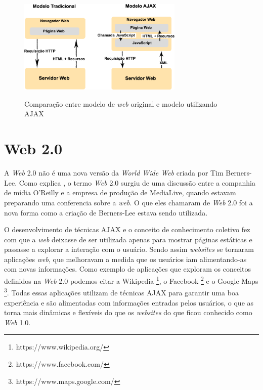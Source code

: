 \begin{figure}[!htb]
    \centering
    \caption{Comparação entre modelo de \textit{web} original e modelo utilizando AJAX}
    \includegraphics[width=0.7\textwidth]{./04-figuras/fund-teorica/comparacao_ajax}
    \label{fig:compajax}
\end{figure}


\section{Web 2.0}
\label{sec:web20}
A \textit{Web} 2.0 não é uma nova versão da \textit{World Wide Web} criada por Tim Berners-Lee. Como explica \cite{Web20}, o termo \textit{Web} 2.0 surgiu de uma discussão entre a companhia de mídia O'Reilly e a empresa de produção de MediaLive, quando estavam preparando uma conferencia sobre a \textit{web}. O que eles chamaram de \textit{Web} 2.0 foi a nova forma como a criação de Berners-Lee estava sendo utilizada.

O desenvolvimento de técnicas AJAX e o conceito de conhecimento coletivo fez com que a \textit{web} deixasse de ser utilizada apenas para mostrar páginas estáticas e passasse a explorar a interação com o usuário. Sendo assim \textit{websites} se tornaram aplicações \textit{web}, que melhoravam a medida que os usuários iam alimentando-as com novas informações. Como exemplo de aplicações que exploram os conceitos definidos na \textit{Web} 2.0 podemos citar a Wikipedia \footnote{https://www.wikipedia.org/}, o Facebook \footnote{https://www.facebook.com/} e o Google Maps \footnote{https://www.maps.google.com/}. Todas essas aplicações utilizam de técnicas AJAX para garantir uma boa experiência e são alimentadas com informações entradas pelos usuários, o que as torna mais dinâmicas e flexíveis do que os \textit{websites} do que ficou conhecido como \textit{Web} 1.0.